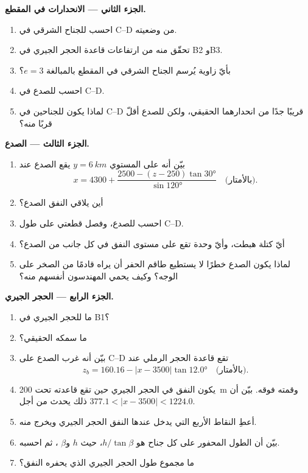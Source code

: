 \begin{problem}
\medskip
\noindent\textbf{الجزء الثاني --- الانحدارات في المقطع.}
\begin{enumerate}[resume]
  \item احسب  للجناح الشرقي في C--D من وضعيته.
  \item تحقّق منه من ارتفاعات قاعدة الحجر الجيري في B2 وB3.
  \item بأيّ زاوية يُرسم الجناح الشرقي في المقطع بالمبالغة $e = 3$؟
  \item احسب  للصدع في C--D.
  \item لماذا يكون  للجناحين في C--D قريبًا جدًا من انحدارهما الحقيقي، ولكن  للصدع أقلّ قربًا منه؟
\end{enumerate}

\medskip
\noindent\textbf{الجزء الثالث --- الصدع.}
\begin{enumerate}[resume]
  \item بيّن أنه على المستوي $y = \qty{6}{km}$ يقع الصدع عند
        \[ x = 4300 + \frac{2500 - (z - 250)\tan\ang{30}}{\sin\ang{120}}
           \quad\text{(بالأمتار)}. \]
  \item أين يلاقي النفق الصدع؟
  \item احسب  للصدع، وفصل قطعتي  على طول C--D.
  \item أيّ كتلة هبطت، وأيّ وحدة تقع على مستوى النفق في كل جانب من الصدع؟
  \item لماذا يكون الصدع خطرًا لا يستطيع طاقم الحفر أن يراه قادمًا من الصخر على الوجه؟ وكيف يحمي المهندسون أنفسهم منه؟
\end{enumerate}

\medskip
\noindent\textbf{الجزء الرابع --- الحجر الجيري.}
\begin{enumerate}[resume]
  \item ما  للحجر الجيري في B1؟
  \item ما سمكه الحقيقي؟
  \item بيّن أنه غرب الصدع على C--D تقع قاعدة الحجر الرملي عند
        \[ z_b = 160.16 - |x - 3500|\tan\ang{12.0} \quad\text{(بالأمتار)}. \]
  \item يكون النفق في الحجر الجيري حين تقع قاعدته تحت \qty{200}{m} وقمته فوقه. بيّن أن ذلك يحدث من أجل $377.1 < |x - 3500|
        < 1224.0$.
  \item أعطِ النقاط الأربع التي يدخل عندها النفق الحجر الجيري ويخرج منه.
  \item بيّن أن الطول المحفور على كل جناح هو $h/\tan\beta$، حيث $h$  و$\beta$ ، ثم احسبه.
  \item ما مجموع طول الحجر الجيري الذي يحفره النفق؟
\end{enumerate}
\end{problem}
